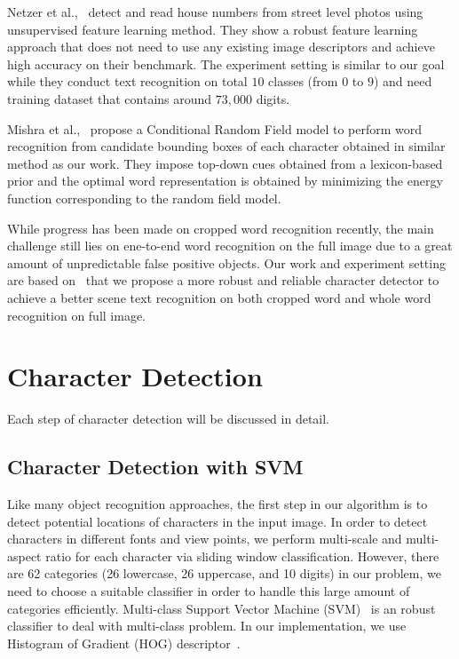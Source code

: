 \documentclass[10pt,twocolumn,letterpaper]{article}
\begin{document}
Netzer et al.,~\cite{121} detect and read house numbers from street level photos using unsupervised feature learning method. They show a robust feature learning approach that does not need to use any existing image descriptors and achieve high accuracy on their benchmark. The experiment setting is similar to our goal while they conduct text recognition on total $10$ classes (from $0$ to $9$) and need training dataset that contains around $73,000$ digits.

Mishra et al.,~\cite{111} propose a Conditional Random Field model to perform word recognition from candidate bounding boxes of each character obtained in similar method as our work. They impose top-down cues obtained from a lexicon-based prior and the optimal word representation is obtained by minimizing the energy function corresponding to the random field model.

While progress has been made on cropped word recognition recently, the main challenge still lies on ene-to-end word recognition on the full image due to a great amount of unpredictable false positive objects. Our work and experiment setting are based on~\cite{417} that we propose a more robust and reliable character detector to achieve a better scene text recognition on both cropped word and whole word recognition on full image.

\section{Character Detection}

Each step of character detection will be discussed in detail.

\subsection{Character Detection with SVM}

Like many object recognition approaches, the first step in our algorithm is to detect potential locations of characters in the input image. In order to detect characters in different fonts and view points, we perform multi-scale and multi-aspect ratio for each character via sliding window classification. However, there are 62 categories (26 lowercase, 26 uppercase, and 10 digits) in our problem, we need to choose a suitable classifier in order to handle this large amount of categories efficiently. Multi-class Support Vector Machine (SVM)~\cite{122} is an robust classifier to deal with multi-class problem. In our implementation, we use Histogram of Gradient (HOG) descriptor~\cite{115}.
\end{document}
